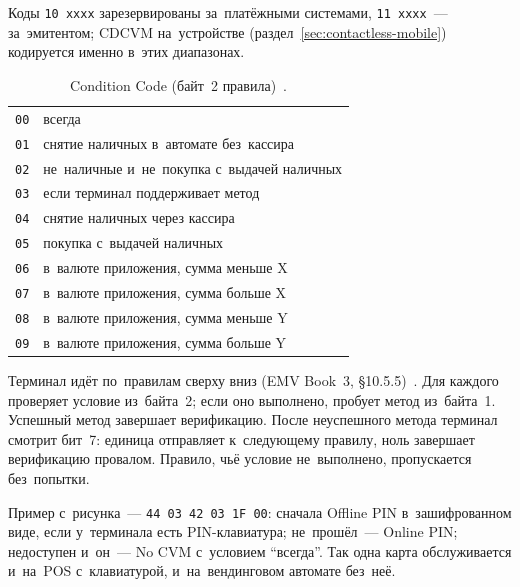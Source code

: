 Коды \texttt{10\,xxxx} зарезервированы за~платёжными системами, \texttt{11\,xxxx}~---
за~эмитентом; CDCVM на~устройстве (раздел~\ref{sec:contactless-mobile}) кодируется
именно в~этих диапазонах.

\begin{table}[H]
  \caption{Condition Code (байт~2 правила)~\cite{emvco-book3}.}\label{tab:cvm-conditions}
  \begingroup
  \tablesetup
  \begin{tabularx}{0.60\textwidth}{@{}P{3.2em} Y@{}}
    \toprule
    \headrow
     &  \\
    \midrule
    \texttt{00} & всегда \\
    \rowsep
    \texttt{01} & снятие наличных в~автомате без~кассира \\
    \rowsep
    \texttt{02} & не~наличные и~не~покупка с~выдачей наличных \\
    \rowsep
    \texttt{03} & если терминал поддерживает метод \\
    \rowsep
    \texttt{04} & снятие наличных через кассира \\
    \rowsep
    \texttt{05} & покупка с~выдачей наличных \\
    \rowsep
    \texttt{06} & в~валюте приложения, сумма меньше X \\
    \rowsep
    \texttt{07} & в~валюте приложения, сумма больше X \\
    \rowsep
    \texttt{08} & в~валюте приложения, сумма меньше Y \\
    \rowsep
    \texttt{09} & в~валюте приложения, сумма больше Y \\
    \bottomrule
  \end{tabularx}\par
  \endgroup
\end{table}

Терминал идёт по~правилам сверху вниз (EMV Book~3,
\S10.5.5)~\cite{emvco-book3}. Для каждого проверяет условие из~байта~2; если оно
выполнено, пробует метод из~байта~1. Успешный метод завершает верификацию.
После неуспешного метода терминал смотрит бит~7: единица отправляет к~следующему
правилу, ноль завершает верификацию провалом. Правило, чьё условие не~выполнено,
пропускается без~попытки.

Пример с~рисунка~--- \texttt{44\,03 42\,03 1F\,00}: сначала Offline PIN
в~зашифрованном виде, если у~терминала есть PIN-клавиатура; не~прошёл~---
Online PIN; недоступен и~он~--- No CVM с~условием \enquote{всегда}. Так одна
карта обслуживается и~на~POS с~клавиатурой, и~на~вендинговом автомате без~неё.

